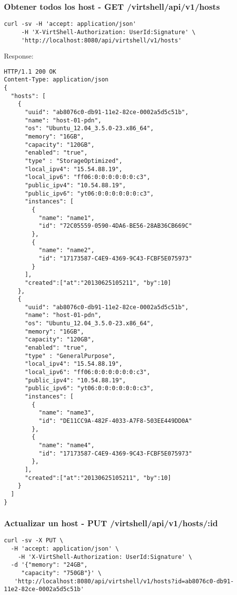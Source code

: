 \subsubsection{Obtener todos los host - GET /virtshell/api/v1/hosts}

\begin{lstlisting}[style=json]
curl -sv -H 'accept: application/json' 
     -H 'X-VirtShell-Authorization: UserId:Signature' \ 
     'http://localhost:8080/api/virtshell/v1/hosts'
\end{lstlisting}

Response:

\begin{lstlisting}[style=json]
HTTP/1.1 200 OK
Content-Type: application/json
{
  "hosts": [
    {
      "uuid": "ab8076c0-db91-11e2-82ce-0002a5d5c51b",
      "name": "host-01-pdn",
      "os": "Ubuntu_12.04_3.5.0-23.x86_64",
      "memory": "16GB",
      "capacity": "120GB",
      "enabled": "true",
      "type" : "StorageOptimized",
      "local_ipv4": "15.54.88.19",
      "local_ipv6": "ff06:0:0:0:0:0:0:c3",
      "public_ipv4": "10.54.88.19",
      "public_ipv6": "yt06:0:0:0:0:0:0:c3",
      "instances": [
        {
          "name": "name1",
          "id": "72C05559-0590-4DA6-BE56-28AB36CB669C"
        },
        {
          "name": "name2",
          "id": "17173587-C4E9-4369-9C43-FCBF5E075973"
        }
      ],
      "created":["at":"20130625105211", "by":10]
    },
    {
      "uuid": "ab8076c0-db91-11e2-82ce-0002a5d5c51b",
      "name": "host-01-pdn",
      "os": "Ubuntu_12.04_3.5.0-23.x86_64",
      "memory": "16GB",
      "capacity": "120GB",
      "enabled": "true",
      "type" : "GeneralPurpose",
      "local_ipv4": "15.54.88.19",
      "local_ipv6": "ff06:0:0:0:0:0:0:c3",
      "public_ipv4": "10.54.88.19",
      "public_ipv6": "yt06:0:0:0:0:0:0:c3",
      "instances": [
        {
          "name": "name3",
          "id": "DE11CC9A-482F-4033-A7F8-503EE449DD0A"
        },
        {
          "name": "name4",
          "id": "17173587-C4E9-4369-9C43-FCBF5E075973"
        },    
      ],
      "created":["at":"20130625105211", "by":10]
    }
  ]
}   
\end{lstlisting}

\subsubsection{Actualizar un host - PUT /virtshell/api/v1/hosts/:id}

\begin{lstlisting}[style=json]
curl -sv -X PUT \
  -H 'accept: application/json' \
    -H 'X-VirtShell-Authorization: UserId:Signature' \
  -d '{"memory": "24GB",
     "capacity": "750GB"}' \
   'http://localhost:8080/api/virtshell/v1/hosts?id=ab8076c0-db91-11e2-82ce-0002a5d5c51b'
\end{lstlisting}

